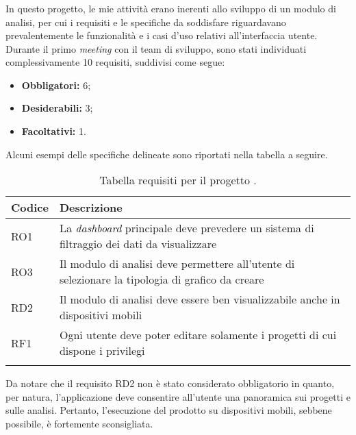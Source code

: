 \subsubsection*{\DS}
In questo progetto, le mie attività erano inerenti allo sviluppo di un modulo di analisi, per cui i requisiti e le specifiche da soddisfare riguardavano prevalentemente le funzionalità e i casi d'uso relativi all'interfaccia utente.
Durante il primo \textit{meeting} con il team di sviluppo, sono stati individuati complessivamente 10 requisiti, suddivisi come segue:
\begin{itemize}
    \item \textbf{Obbligatori:} 6;
    \item \textbf{Desiderabili:} 3;
    \item \textbf{Facoltativi:} 1.
\end{itemize}
Alcuni esempi delle specifiche delineate sono riportati nella tabella a seguire.
\begin{center}
	\renewcommand{\arraystretch}{1.5}
	\begin{longtable}{ | p{0.1\linewidth} | p{0.9\linewidth} |}	 
		\hline   
	    \rowcolor{header}\textbf{Codice}&\textbf{Descrizione}\\
		\hline    	
    	RO1 & La \textit{dashboard} principale deve prevedere un sistema di filtraggio dei dati da visualizzare \\
    	RO3 & Il modulo di analisi deve permettere all'utente di selezionare la tipologia di grafico da creare \\
    	RD2 & Il modulo di analisi deve essere ben visualizzabile anche in dispositivi mobili \\
    	RF1 & Ogni utente deve poter editare solamente i progetti di cui dispone i privilegi  \\
    	\hline
		\rowcolor{white}    	
    	\caption{Tabella requisiti per il progetto \DS{}.}
	\end{longtable}
	\label{tab:requisiti-digitalsnapshots}
\end{center}
Da notare che il requisito RD2 non è stato considerato obbligatorio in quanto, per natura, l'applicazione deve consentire all'utente una panoramica sui progetti e sulle analisi. Pertanto, l'esecuzione del prodotto su dispositivi mobili, sebbene possibile, è fortemente sconsigliata.

